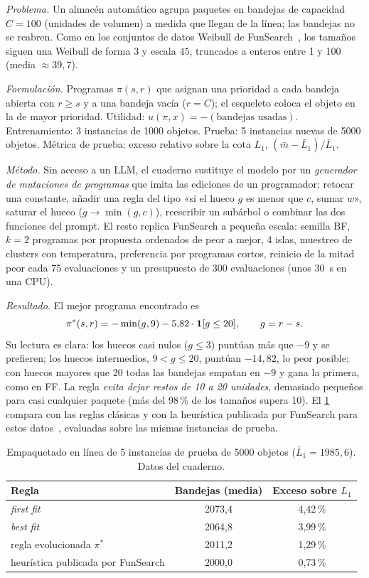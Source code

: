 \begin{ejemplo}\label{ej:caso-bp}
\emph{Problema.} Un almacén automático agrupa paquetes en bandejas de capacidad $C=100$ (unidades de volumen) a medida que llegan de la línea; las bandejas no se reabren. Como en los conjuntos de datos Weibull de FunSearch~\cite{funsearch-code,hp}, los tamaños siguen una Weibull de forma $3$ y escala $45$, truncados a enteros entre 1 y 100 (media $\approx 39{,}7$).

\emph{Formulación.} Programas $\pi(s,r)$ que asignan una prioridad a cada bandeja abierta con $r\ge s$ y a una bandeja vacía ($r=C$); el esqueleto coloca el objeto en la de mayor prioridad. Utilidad: $u(\pi,x)=-(\text{bandejas usadas})$. Entrenamiento: 3 instancias de 1000 objetos. Prueba: 5 instancias nuevas de 5000 objetos. Métrica de prueba: exceso relativo sobre la cota $L_1$, $(\bar m-\bar L_1)/\bar L_1$.

\emph{Método.} Sin acceso a un LLM, el cuaderno sustituye el modelo por un \emph{generador de mutaciones de programas} que imita las ediciones de un programador: retocar una constante, añadir una regla del tipo «si el hueco $g$ es menor que $c$, sumar $w$», saturar el hueco ($g\to\min(g,c)$), reescribir un subárbol o combinar las dos funciones del prompt. El resto replica FunSearch a pequeña escala: semilla BF, $k=2$ programas por propuesta ordenados de peor a mejor, 4 islas, muestreo de clusters con temperatura, preferencia por programas cortos, reinicio de la mitad peor cada 75 evaluaciones y un presupuesto de 300 evaluaciones (unos 30~s en una CPU).

\emph{Resultado.} El mejor programa encontrado es
\[
\pi^{*}(s,r)=-\min(g,9)-5{,}82\cdot\mathbf{1}[g\le 20],\qquad g=r-s .
\]
Su lectura es clara: los huecos casi nulos ($g\le 3$) puntúan más que $-9$ y se prefieren; los huecos intermedios, $9<g\le 20$, puntúan $-14{,}82$, lo peor posible; con huecos mayores que 20 todas las bandejas empatan en $-9$ y gana la primera, como en FF. La regla \emph{evita dejar restos de 10 a 20 unidades}, demasiado pequeños para casi cualquier paquete (más del 98\,\% de los tamaños supera 10). El \cref{tab:bp} compara con las reglas clásicas y con la heurística publicada por FunSearch para estos datos~\cite{funsearch-code}, evaluadas sobre las mismas instancias de prueba.
\end{ejemplo}

\begin{table}[h]
\centering\small
\caption{Empaquetado en línea de 5 instancias de prueba de 5000 objetos ($\bar L_1=1985{,}6$). Datos del cuaderno.}\label{tab:bp}
\begin{tabular}{@{}lcc@{}}
\toprule
Regla & Bandejas (media) & Exceso sobre $L_1$ \\
\midrule
\emph{first fit} & 2073{,}4 & 4{,}42\,\% \\
\emph{best fit} & 2064{,}8 & 3{,}99\,\% \\
regla evolucionada $\pi^{*}$ & 2011{,}2 & 1{,}29\,\% \\
heurística publicada por FunSearch & 2000{,}0 & 0{,}73\,\% \\
\bottomrule
\end{tabular}
\end{table}

